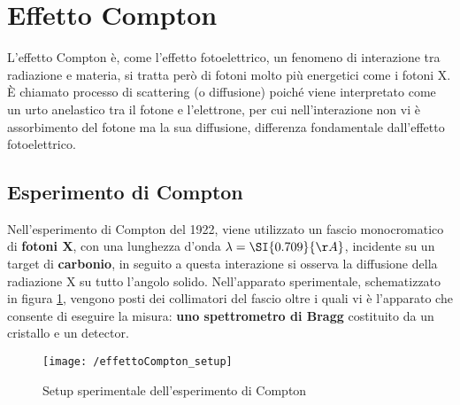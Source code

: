 
\section{Effetto Compton}
L'effetto Compton è, come l'effetto fotoelettrico, un fenomeno di interazione tra radiazione e materia, si tratta però di fotoni molto più energetici come i fotoni X.
È chiamato processo di scattering (o diffusione) poiché viene interpretato come un urto anelastico tra il fotone e l'elettrone, per cui nell'interazione non vi è assorbimento del fotone ma la sua diffusione, differenza fondamentale dall'effetto fotoelettrico.


\subsection{Esperimento di Compton}
Nell'esperimento di Compton del 1922, viene utilizzato un fascio monocromatico di \textbf{fotoni X}, con una lunghezza d'onda $\lambda = \SI{0.709}{\AA}$, incidente su un target di \textbf{carbonio}, in seguito a questa interazione si osserva la diffusione della radiazione X su tutto l'angolo solido.
Nell'apparato sperimentale, schematizzato in figura \ref{schema_compton}, vengono posti dei collimatori del fascio oltre i quali vi è l'apparato che consente di eseguire la misura: \textbf{uno spettrometro di Bragg} costituito da un cristallo e un detector.
\begin{figure}[h]
\centering
\texttt{[image: /effettoCompton\_setup]}
\caption{Setup sperimentale dell'esperimento di Compton}
\label{schema_compton}
\end{figure}

